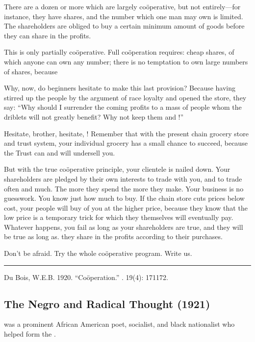 \documentclass[letterpaper,10pt,english]{jupyterBook}
\begin{document}
\sphinxAtStartPar
There are a dozen or more which are largely coöperative, but not entirely—for instance, they have shares, and the number which one man may own is limited. The shareholders are obliged to buy a certain minimum amount of goods before they can share in the profits.

\sphinxAtStartPar
This is only partially coöperative. Full coöperation requires: cheap shares, of which anyone can own any number;  there is no temptation to own large numbers of shares, because 

\sphinxAtStartPar
Why, now, do beginners hesitate to make this last provision? Because having stirred up the people by the argument of race loyalty and opened the store, they say: “Why should I surrender the coming profits to a mass of people whom the driblets will not greatly benefit? Why not keep them and !”

\sphinxAtStartPar
Hesitate, brother, hesitate, ! Remember that with the present chain grocery store and trust system, your individual grocery has a small chance to succeed, because the Trust can and will undersell you.

\sphinxAtStartPar
But with the true coöperative principle, your clientele is nailed down. Your shareholders are pledged by their own interests to trade with you, and to trade often and much. The more they spend the more they make. Your business is no guesswork. You know just how much to buy. If the chain store cuts prices below cost, your people will buy of you at the higher price, because they know that the low price is a temporary trick for which they themselves will eventually pay. Whatever happens, you  fail as long as your shareholders are true, and they will be true as long as. they share in the profits according to their purchases.

\sphinxAtStartPar
Don’t be afraid. Try the whole coöperative program. Write us.


\bigskip\hrule\bigskip


\sphinxAtStartPar
{} Du Bois, W.E.B. 1920. “Coöperation.” . 19(4): 171\sphinxhyphen{}172.


\subsection{The Negro and Radical Thought (1921)}
\label{\detokenize{Volumes/22/03/negro_and_radical_thought:the-negro-and-radical-thought-1921}}\label{\detokenize{Volumes/22/03/negro_and_radical_thought::doc}}
\begin{sphinxShadowBox}
\sphinxstylesidebartitle{}

\sphinxAtStartPar
{} was a prominent African American poet, socialist, and black nationalist who helped form the .
\end{sphinxShadowBox}
\end{document}
